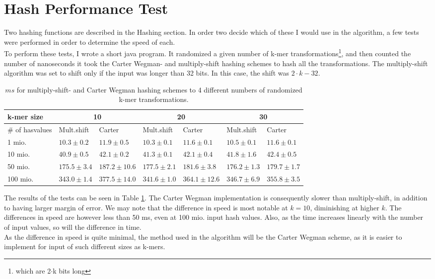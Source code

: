 \documentclass[../../main.tex]{subfiles}
\begin{document}
\section{Hash Performance Test}
\label{sec:hashtest}

Two hashing functions are described in the Hashing section. In order two decide which of these I would use in the algorithm, a few tests were performed in order to determine the speed of each.\\

To perform these tests, I wrote a short java program. It randomized a given number of k-mer transformations\footnote{which are 2$\cdot$k bits long}, and then counted the number of nanoseconds it took the Carter Wegman- and multiply-shift hashing schemes to hash all the transformations. The multiply-shift algorithm was set to shift only if the input was longer than 32 bits. In this case, the shift was $2\cdot k - 32$.\\

\begin{table}[h]
\begin{tabular}{| l | l | l | l | l | l | l |}
\hline
k-mer size & \multicolumn{2}{c|}{10} & \multicolumn{2}{c|}{20} & \multicolumn{2}{c|}{30} \\
\hline
\# of hasvalues & Mult.shift & Carter & Mult.shift & Carter & Mult.shift & Carter \\
 \hline
1 mio. & $10.3\pm 0.2$ & $11.9\pm 0.5$ & $10.3\pm 0.1$ & $11.6\pm 0.1$ & $10.5\pm 0.1$ & $11.6\pm 0.1$\\
10 mio. & $40.9\pm 0.5$ & $42.1\pm0.2$ & $41.3\pm 0.1$ & $42.1\pm0.4$ & $41.8\pm 1.6$ & $42.4\pm0.5$\\
50 mio. & $175.5\pm3.4$ & $187.2\pm 10.6$ & $177.5\pm2.1$  & $181.6\pm3.8$ & $176.2\pm1.3$ & $179.7\pm1.7$\\
100 mio. & $343.0\pm1.4$ & $377.5\pm14.0$ & $341.6\pm1.0$ & $364.1\pm12.6$ & $346.7\pm6.9$ & $355.8\pm3.5$\\
\hline
\end{tabular}
\caption{$ms$ for multiply-shift- and Carter Wegman hashing schemes to 4 different numbers of randomized k-mer transformations.}
\label{table:hashTest}
\end{table}

The results of the tests can be seen in Table \ref{table:hashTest}. The Carter Wegman implementation is consequently slower than multiply-shift, in addition to having larger margin of error. We may note that the difference in speed is most notable at $k=10$, diminishing at higher $k$. The differences in speed are however less than 50 ms, even at 100 mio. input hash values. Also, as the time increases linearly with the number of input values, so will the difference in time.\\

As the difference in speed is quite minimal, the method used in the algorithm will be the Carter Wegman scheme, as it is easier to implement for input of such different sizes as k-mers.
\end{document}
